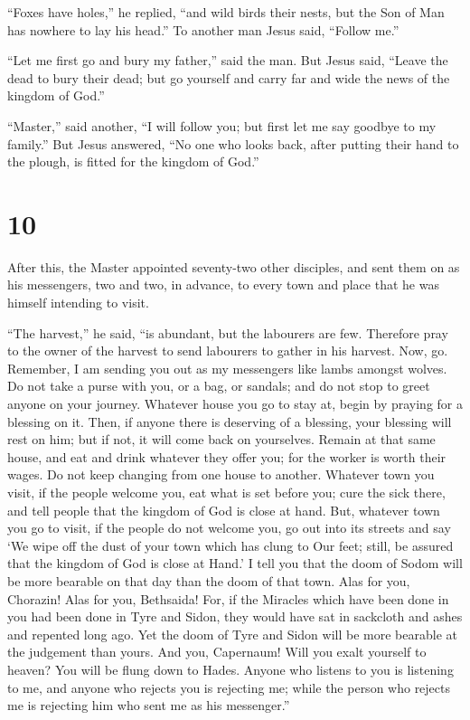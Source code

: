  ``Foxes have holes,'' he replied, ``and wild birds their
nests, but the Son of Man has nowhere to lay his head.'' 
To another man Jesus said, ``Follow me.''

``Let me first go and bury my father,'' said the man.  But
Jesus said, ``Leave the dead to bury their dead; but go yourself and
carry far and wide the news of the kingdom of God.''

 ``Master,'' said another, ``I will follow you; but first
let me say goodbye to my family.''  But Jesus answered,
``No one who looks back, after putting their hand to the plough, is
fitted for the kingdom of God.''

\hypertarget{section-8}{%
\section{10}\label{section-8}}

 After this, the Master appointed seventy-two other
disciples, and sent them on as his messengers, two and two, in advance,
to every town and place that he was himself intending to visit.

 ``The harvest,'' he said, ``is abundant, but the labourers
are few. Therefore pray to the owner of the harvest to send labourers to
gather in his harvest.  Now, go. Remember, I am sending you
out as my messengers like lambs amongst wolves.  Do not take
a purse with you, or a bag, or sandals; and do not stop to greet anyone
on your journey.  Whatever house you go to stay at, begin by
praying for a blessing on it.  Then, if anyone there is
deserving of a blessing, your blessing will rest on him; but if not, it
will come back on yourselves.  Remain at that same house,
and eat and drink whatever they offer you; for the worker is worth their
wages. Do not keep changing from one house to another. 
Whatever town you visit, if the people welcome you, eat what is set
before you;  cure the sick there, and tell people that the
kingdom of God is close at hand.  But, whatever town you go
to visit, if the people do not welcome you, go out into its streets and
say  `We wipe off the dust of your town which has clung to
Our feet; still, be assured that the kingdom of God is close at Hand.'
 I tell you that the doom of Sodom will be more bearable on
that day than the doom of that town.  Alas for you,
Chorazin! Alas for you, Bethsaida! For, if the Miracles which have been
done in you had been done in Tyre and Sidon, they would have sat in
sackcloth and ashes and repented long ago.  Yet the doom of
Tyre and Sidon will be more bearable at the judgement than yours.
 And you, Capernaum! Will you exalt yourself to heaven? You
will be flung down to Hades.  Anyone who listens to you is
listening to me, and anyone who rejects you is rejecting me; while the
person who rejects me is rejecting him who sent me as his messenger.''

